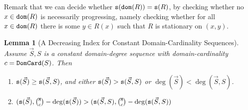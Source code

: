 \documentclass{lmcs}
\newtheorem{lemma}[theorem]{Lemma}
\begin{document}
Remark that we can decide whether ${\tt s}({\tt dom}(R)) = {\tt s}(R)$, by checking whether
no $x \in {\tt dom}(R)$ is necessarily progressing, namely checking whether
for all $x \in {\tt dom}(R)$ there is some $y \in R(x)$ such that $R$ is stationary on $(x,y)$.


\begin{lemma}[A Decreasing Index for Constant Domain-Cardinality Sequences] 
\label{lemma-stationarity-degree}
Assume $\vec{S},S$ is a constant domain-degree sequence with domain-cardinality
$c = {\tt DomCard}(S)$. Then

\begin{enumerate}
\item
\label{lemma-stationarity-degree-01}
${\tt s}(\vec{S}) \ge {\tt s}(\vec{S},S)$, and either ${\tt s}(\vec{S}) > {\tt s}(\vec{S},S)$
or $\deg(\vec{S}) < \deg(\vec{S},S)$.

\item
\label{lemma-stationarity-degree-02}
$
(\size(\vec{S}), \newton{\MaxInd}{c} - \deg(\size(\vec{S}))
>
(\size(\vec{S},S), \newton{\MaxInd}{c} - \deg(\size(\vec{S},S))
$

\end{enumerate}
\end{lemma}

\end{document}

